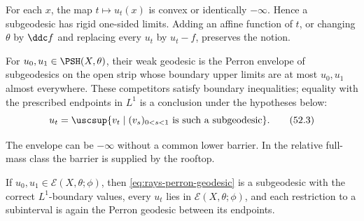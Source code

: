 For each $x$, the map $t\mapsto u_t(x)$ is convex or identically
$-\infty$.  Hence a subgeodesic has rigid one-sided limits.  Adding an
affine function of $t$, or changing $\theta$ by $\ddc f$ and
replacing every $u_t$ by $u_t-f$, preserves the notion.

\begin{definition}
\label{def:rays-geodesic-segment}
For $u_0,u_1\in\PSH(X,\theta)$, their weak geodesic is the Perron
envelope of subgeodesics on the open strip whose boundary upper limits
are at most $u_0,u_1$ almost everywhere. These competitors satisfy boundary
inequalities; equality with the prescribed endpoints in $L^1$ is a
conclusion under the hypotheses below:
\[
 u_t=\uscsup\{v_t\mid (v_s)_{0<s<1}\text{ is such a subgeodesic}\}.
\tag{52.3}\label{eq:rays-perron-geodesic}
\]
\end{definition}

The envelope can be $-\infty$ without a common lower barrier.  In the
relative full-mass class the barrier is supplied by the rooftop.

\begin{theorem}\label{thm:rays-relative-geodesic}
If $u_0,u_1\in\mathcal E(X,\theta;\phi)$, then
\eqref{eq:rays-perron-geodesic} is a subgeodesic with the correct
$L^1$-boundary values, every $u_t$ lies in
$\mathcal E(X,\theta;\phi)$, and each restriction to a subinterval is
again the Perron geodesic between its endpoints.
\end{theorem}

